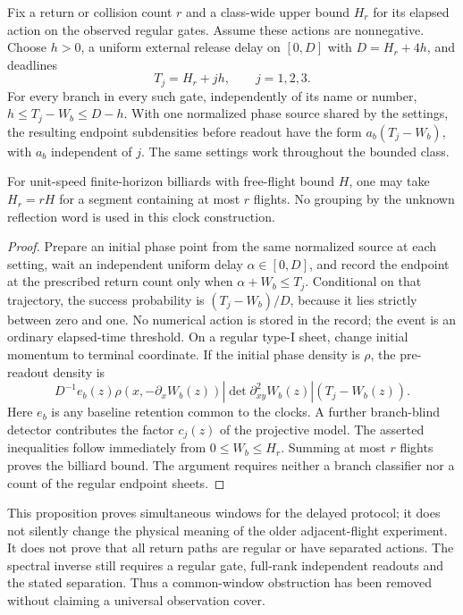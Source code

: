 \begin{proposition}
\label{prop:v81-common-clocks}
Fix a return or collision count $r$ and a class-wide upper bound $H_r$
for its elapsed action on the observed regular gates.  Assume these
actions are nonnegative.  Choose $h>0$, a uniform external release delay
on $[0,D]$ with $D=H_r+4h$, and deadlines
\[
                     T_j=H_r+jh,\qquad j=1,2,3.
\]
For every branch in every such gate, independently of its name or
number, $h\le T_j-W_b\le D-h$.  With one normalized phase source
shared by the settings, the resulting endpoint subdensities before
readout have the form $a_b(T_j-W_b)$, with $a_b$ independent of $j$.
The same settings work throughout the bounded class.

For unit-speed finite-horizon billiards with free-flight bound $H$,
one may take $H_r=rH$ for a segment containing at most $r$ flights.
No grouping by the unknown reflection word is used in this clock
construction.
\end{proposition}
\begin{proof}
Prepare an initial phase point from the same normalized source at each
setting, wait an independent uniform delay $\alpha\in[0,D]$, and record
the endpoint at the prescribed return count only when
$\alpha+W_b\le T_j$.  Conditional on that trajectory, the success
probability is $(T_j-W_b)/D$, because it lies strictly between zero and
one.  No numerical action is stored in the record; the event is an
ordinary elapsed-time threshold.  On a regular type-I sheet, change
initial momentum to terminal coordinate.  If the initial phase density
is $\rho$, the pre-readout density is
\[
 D^{-1}e_b(z)\rho(x,-\partial_xW_b(z))
                  |\det\partial_{xy}^2W_b(z)|(T_j-W_b(z)).
\]
Here $e_b$ is any baseline retention common to the clocks.  A further
branch-blind detector contributes the factor $c_j(z)$ of the projective
model.  The asserted inequalities follow immediately from
$0\le W_b\le H_r$.  Summing at most $r$ flights proves the billiard
bound.  The argument requires neither a branch classifier nor a count
of the regular endpoint sheets.
\end{proof}

This proposition proves simultaneous windows for the delayed protocol;
it does not silently change the physical meaning of the older
adjacent-flight experiment.  It does not prove that all return paths
are regular or have separated actions.  The spectral inverse still
requires a regular gate, full-rank independent readouts and the stated
separation.  Thus a common-window obstruction has been removed without
claiming a universal observation cover.

